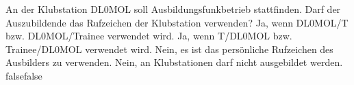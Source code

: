     {An der Klubstation DL0MOL soll Ausbildungsfunkbetrieb stattfinden. Darf der Auszubildende das Rufzeichen der Klubstation verwenden?}
    {Ja, wenn DL0MOL/T bzw. DL0MOL/Trainee verwendet wird.}
    {Ja, wenn T/DL0MOL bzw. Trainee/DL0MOL verwendet wird.}
    {Nein, es ist das persönliche Rufzeichen des Ausbilders zu verwenden.}
    {Nein, an Klubstationen darf nicht ausgebildet werden.}
    {false}{false}